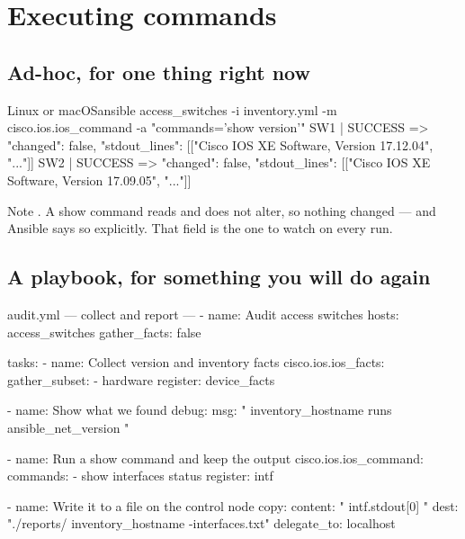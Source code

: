 \section{Executing commands}

\subsection{Ad-hoc, for one thing right now}

\begin{hostcmd}{Linux or macOS}{ansible access\_switches -i inventory.yml -m cisco.ios.ios\_command -a "commands='show version'"}
SW1 | SUCCESS => {
    "changed": false,
    "stdout_lines": [["Cisco IOS XE Software, Version 17.12.04", "..."]]
}
SW2 | SUCCESS => {
    "changed": false,
    "stdout_lines": [["Cisco IOS XE Software, Version 17.09.05", "..."]]
}
\end{hostcmd}

Note . A show command reads and does not alter, so nothing
changed --- and Ansible says so explicitly. That field is the one to watch on
every run.

\subsection{A playbook, for something you will do again}

\begin{playbook}{audit.yml --- collect and report}
---
- name: Audit access switches
  hosts: access_switches
  gather_facts: false

  tasks:
    - name: Collect version and inventory facts
      cisco.ios.ios_facts:
        gather_subset:
          - hardware
      register: device_facts

    - name: Show what we found
      debug:
        msg: "{{ inventory_hostname }} runs {{ ansible_net_version }}"

    - name: Run a show command and keep the output
      cisco.ios.ios_command:
        commands:
          - show interfaces status
      register: intf

    - name: Write it to a file on the control node
      copy:
        content: "{{ intf.stdout[0] }}"
        dest: "./reports/{{ inventory_hostname }}-interfaces.txt"
      delegate_to: localhost
\end{playbook}

